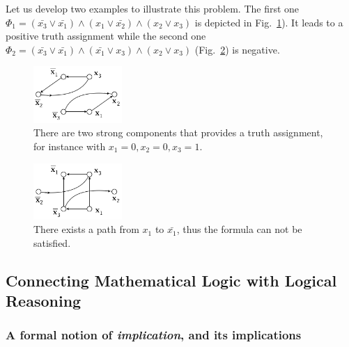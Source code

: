 Let us develop two examples to illustrate this problem.  The first one
$\Phi_1 = (\bar{x_{3}} \vee \bar{x_{1}}) \wedge (x_{1} \vee
\bar{x_{2}}) \wedge (x_{2} \vee x_{3})$ is depicted in
Fig.~\ref{2SATyes}). It leads to a positive truth assignment while the
second one $\Phi_2 = (\bar{x_{3}} \vee \bar{x_{1}}) \wedge
(\bar{x_{1}} \vee {x_{3}}) \wedge (x_{2} \vee x_{3})$
(Fig.~\ref{2SATno}) is negative.


\begin{figure}[h]
\begin{center}
\includegraphics[width=0.3\textwidth]{FiguresGraph/2SATyes.png}
        \caption{There are two strong components that provides a truth assignment, for instance with $x_1=0, x_2=0, x_3=1$.}
\label{2SATyes}
\end{center}
\end{figure}

\begin{figure}[h]
\begin{center}
\includegraphics[width=0.3\textwidth]{FiguresGraph/2SATno.png}
        \caption{There exists a path from $x_1$ to $\bar{x_1}$, thus the formula can not be satisfied.}
\label{2SATno}
\end{center}
\end{figure}



\subsection{Connecting Mathematical Logic with Logical
  Reasoning}
\label{sec:practical-logic}

\subsubsection{A formal notion of {\em implication}, and its
  implications}
\label{sec:implication}


